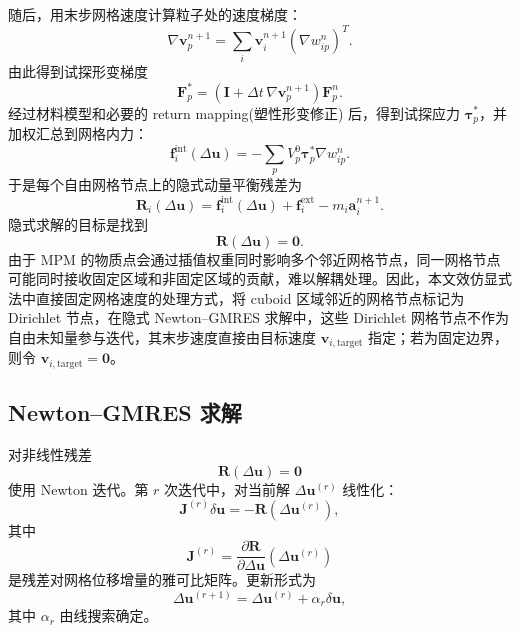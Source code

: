\documentclass[a4paper]{article}
\begin{document}
随后，用末步网格速度计算粒子处的速度梯度：
\[
    \nabla\bm{v}_p^{n+1}
    =
    \sum_i
    \bm{v}_i^{n+1}
    \left(
        \nabla w_{ip}^n
    \right)^T.
\]
由此得到试探形变梯度
\[
    \bm{F}_p^{\ast}
    =
    \left(
        \bm{I}
        +
        \Delta t\,\nabla\bm{v}_p^{n+1}
    \right)
    \bm{F}_p^n.
\]
经过材料模型和必要的 return mapping(塑性形变修正) 后，得到试探应力 $\bm{\tau}_p^{\ast}$，并加权汇总到网格内力：
\[
    \bm{f}_i^{\mathrm{int}}
    \left(
        \Delta\bm{u}
    \right)
    =
    -
    \sum_p
    V_p^0
    \bm{\tau}_p^{\ast}
    \nabla w_{ip}^n.
\]
于是每个自由网格节点上的隐式动量平衡残差为
\[
    \bm{R}_i
    \left(
        \Delta\bm{u}
    \right)
    =
    \bm{f}_i^{\mathrm{int}}
    \left(
        \Delta\bm{u}
    \right)
    +
    \bm{f}_i^{\mathrm{ext}}
    -
    m_i\bm{a}_i^{n+1}.
\]
隐式求解的目标是找到
\[
    \bm{R}
    \left(
        \Delta\bm{u}
    \right)
    =
    \bm{0}.
\]
由于 MPM 的物质点会通过插值权重同时影响多个邻近网格节点，同一网格节点可能同时接收固定区域和非固定区域的贡献，难以解耦处理。因此，本文效仿显式法中直接固定网格速度的处理方式，将 cuboid 区域邻近的网格节点标记为 Dirichlet 节点，在隐式 Newton--GMRES 求解中，这些 Dirichlet 网格节点不作为自由未知量参与迭代，其末步速度直接由目标速度 $\bm{v}_{i,\mathrm{target}}$ 指定；若为固定边界，则令 $\bm{v}_{i,\mathrm{target}}=\bm{0}$。

\subsection{Newton--GMRES 求解}

对非线性残差
\[
    \bm{R}
    \left(
        \Delta\bm{u}
    \right)
    =
    \bm{0}
\]
使用 Newton 迭代。第 $r$ 次迭代中，对当前解 $\Delta\bm{u}^{(r)}$ 线性化：
\[
    \bm{J}^{(r)}
    \delta\bm{u}
    =
    -
    \bm{R}
    \left(
        \Delta\bm{u}^{(r)}
    \right),
\]
其中
\[
    \bm{J}^{(r)}
    =
    \frac{
        \partial \bm{R}
    }{
        \partial \Delta\bm{u}
    }
    \left(
        \Delta\bm{u}^{(r)}
    \right)
\]
是残差对网格位移增量的雅可比矩阵。更新形式为
\[
    \Delta\bm{u}^{(r+1)}
    =
    \Delta\bm{u}^{(r)}
    +
    \alpha_r\delta\bm{u},
\]
其中 $\alpha_r$ 由线搜索确定。
\end{document}
